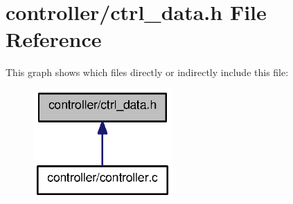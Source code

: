 \section{controller/ctrl\_\-data.h File Reference}
\label{ctrl__data_8h}
This graph shows which files directly or indirectly include this file:
\nopagebreak
\begin{figure}[H]
\begin{center}
\leavevmode
\includegraphics[width=150pt]{ctrl__data_8h__dep__incl}
\end{center}
\end{figure}
